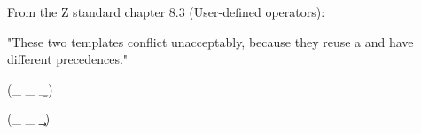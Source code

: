 From the Z standard chapter 8.3 (User-defined operators):

  "These two templates conflict unacceptably, because they
   reuse a and have different precedences."


\begin{zed}
 \leftassoc (\_ \a \_ \b \_)
\end{zed}

\begin{zed}
 \leftassoc (\_ \a \_ \c \_)
\end{zed}

